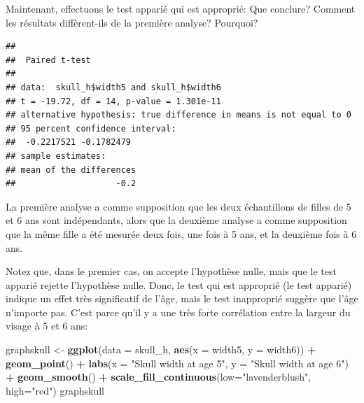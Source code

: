 \documentclass[12pt,]{book}
\newenvironment{Shaded}{\begin{snugshade}}{\end{snugshade}}
\newcommand{\DataTypeTok}[1]{\textcolor[rgb]{0.13,0.29,0.53}{#1}}
\newcommand{\KeywordTok}[1]{\textcolor[rgb]{0.13,0.29,0.53}{\textbf{#1}}}
\newcommand{\NormalTok}[1]{#1}
\newcommand{\OperatorTok}[1]{\textcolor[rgb]{0.81,0.36,0.00}{\textbf{#1}}}
\newcommand{\OtherTok}[1]{\textcolor[rgb]{0.56,0.35,0.01}{#1}}
\newcommand{\StringTok}[1]{\textcolor[rgb]{0.31,0.60,0.02}{#1}}
\begin{document}
Maintenant, effectuons le test apparié qui est approprié: Que conclure? Comment les résultats diffèrent-ils de la première analyse? Pourquoi?

\begin{Shaded}
\end{Shaded}

\begin{verbatim}
## 
##  Paired t-test
## 
## data:  skull_h$width5 and skull_h$width6
## t = -19.72, df = 14, p-value = 1.301e-11
## alternative hypothesis: true difference in means is not equal to 0
## 95 percent confidence interval:
##  -0.2217521 -0.1782479
## sample estimates:
## mean of the differences 
##                    -0.2
\end{verbatim}

La première analyse a comme supposition que les deux échantillons de filles de 5 et 6 ans sont indépendants, alors que la deuxième analyse a comme supposition que la même fille a été mesurée deux fois, une fois à 5 ans, et la deuxième fois à 6 ans.

Notez que, dans le premier cas, on accepte l'hypothèse nulle, mais que le test apparié rejette l'hypothèse nulle. Donc, le test qui est approprié (le test apparié) indique un effet très significatif de l'âge, mais le test inapproprié suggère que l'âge n'importe pas. C'est parce qu'il y a une très forte corrélation entre la largeur du visage à 5 et 6 ans:

\begin{Shaded}
\begin{Highlighting}[]
\NormalTok{graphskull <-}\StringTok{ }\KeywordTok{ggplot}\NormalTok{(}\DataTypeTok{data =}\NormalTok{ skull_h, }\KeywordTok{aes}\NormalTok{(}\DataTypeTok{x =}\NormalTok{ width5, }\DataTypeTok{y =}\NormalTok{ width6)) }\OperatorTok{+}
\StringTok{  }\KeywordTok{geom_point}\NormalTok{() }\OperatorTok{+}
\StringTok{  }\KeywordTok{labs}\NormalTok{(}\DataTypeTok{x =} \StringTok{"Skull width at age 5"}\NormalTok{, }\DataTypeTok{y =} \StringTok{"Skull width at age 6"}\NormalTok{) }\OperatorTok{+}
\StringTok{  }\KeywordTok{geom_smooth}\NormalTok{() }\OperatorTok{+}
\StringTok{  }\KeywordTok{scale_fill_continuous}\NormalTok{(}\DataTypeTok{low=}\StringTok{"lavenderblush"}\NormalTok{, }\DataTypeTok{high=}\StringTok{"red"}\NormalTok{)}
\NormalTok{graphskull}
\end{Highlighting}
\end{Shaded}
\end{document}
